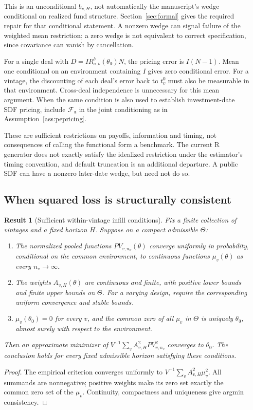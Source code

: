 \documentclass[11pt]{article}
\theoremstyle{plain}
\newtheorem{result}{Result}[section]
\theoremstyle{definition}
\begin{document}
This is an unconditional $b_{v,H}$, not automatically the manuscript's wedge conditional on realized fund structure. Section~\ref{sec:formal} gives the required repair for that conditional statement. A nonzero wedge can signal failure of the weighted mean restriction; a zero wedge is not equivalent to correct specification, since covariance can vanish by cancellation.

For a single deal with $D=IR^b_{a,b}(\theta_0)N$, the pricing error is $I(N-1)$. Mean one conditional on an environment containing $I$ gives zero conditional error. For a vintage, the discounting of each deal's error back to $t_v^0$ must also be measurable in that environment. Cross-deal independence is unnecessary for this mean argument. When the same condition is also used to establish investment-date SDF pricing, include $\mathcal F_a$ in the joint conditioning as in Assumption~\ref{ass:pepricing}.

These are sufficient restrictions on payoffs, information and timing, not consequences of calling the functional form a benchmark. The current R generator does not exactly satisfy the idealized restriction under the estimator's timing convention, and default truncation is an additional departure. A public SDF can have a nonzero later-date wedge, but need not do so.

\subsection{When squared loss is structurally consistent}

\begin{result}[Sufficient within-vintage infill conditions]
\label{res:consistency}
Fix a finite collection of vintages and a fixed horizon $H$. Suppose on a compact admissible $\Theta$:
\begin{enumerate}[label=(\alph*)]
\item The normalized pooled functions $PV_{v,n_v}(\theta)$ converge uniformly in probability, conditional on the common environment, to continuous functions $\mu_v(\theta)$ as every $n_v\to\infty$.
\item The weights $A_{v,H}(\theta)$ are continuous and finite, with positive lower bounds and finite upper bounds on $\Theta$. For a varying design, require the corresponding uniform convergence and stable bounds.
\item $\mu_v(\theta_0)=0$ for every $v$, and the common zero of all $\mu_v$ in $\Theta$ is uniquely $\theta_0$, almost surely with respect to the environment.
\end{enumerate}
Then an approximate minimizer of $V^{-1}\sum_v A_{v,H}^2PV_{v,n_v}^2$ converges to $\theta_0$. The conclusion holds for every fixed admissible horizon satisfying these conditions.
\end{result}
\begin{proof}
The empirical criterion converges uniformly to $V^{-1}\sum_v A_{v,H}^2\mu_v^2$. All summands are nonnegative; positive weights make its zero set exactly the common zero set of the $\mu_v$. Continuity, compactness and uniqueness give argmin consistency.
\end{proof}
\end{document}
